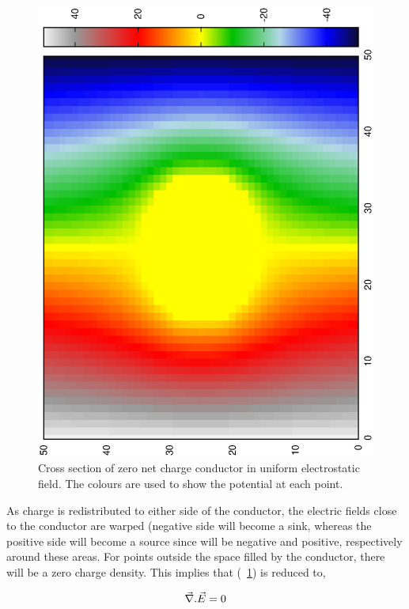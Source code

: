 \documentclass[aps,twocolumn,pre,nofootinbib]{revtex4}
\begin{document}
\begin{figure}
\includegraphics*[width=\breite \columnwidth]{newtest.ps} 
\caption{Cross section of zero net charge conductor in uniform electrostatic field. The colours are used to show the potential at each point.
}
\label{fig:fig1}
\end{figure}

As charge is redistributed to either side of the conductor, the electric fields close to the conductor are warped (negative side will become a sink, whereas the positive side will become a source since \den  will be negative and positive, respectively around these areas. For points outside the space filled by the conductor, there will be a zero charge density. This implies that (~\ref{fig:fig1}) is reduced to,

\begin{equation}
\begin{split}
\vec{\nabla}.\vec{E}= 0 
\end{split}
\label{eqn2}
\end{equation}
\end{document}
